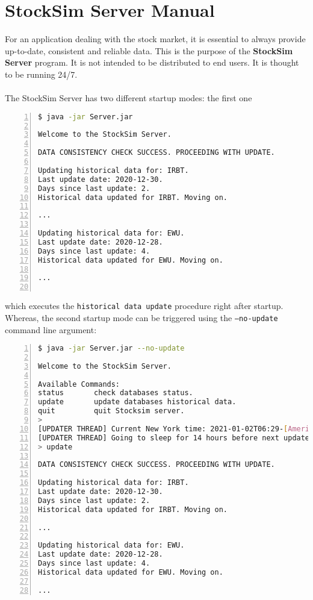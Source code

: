 \chapter{StockSim Server Manual}
For an application dealing with the stock market, it is essential to 
always provide up-to-date, consistent and reliable data. This is the purpose of 
the \textbf{StockSim Server} program. It is not intended to be distributed to 
end users. It is thought to be running 24/7.\\
\\
The StockSim Server has two different startup modes: the first one
\begin{lstlisting}[basicstyle=\footnotesize,language=bash,numbers=left,
numberstyle=\footnotesize,numbersep=8pt,frame=single]
$ java -jar Server.jar

Welcome to the StockSim Server.

DATA CONSISTENCY CHECK SUCCESS. PROCEEDING WITH UPDATE.

Updating historical data for: IRBT.
Last update date: 2020-12-30.
Days since last update: 2.
Historical data updated for IRBT. Moving on.

...

Updating historical data for: EWU.
Last update date: 2020-12-28.
Days since last update: 4.
Historical data updated for EWU. Moving on.

...


\end{lstlisting}
which executes the \texttt{historical data update} procedure right after
startup. Whereas, the second startup mode can be triggered using the
\texttt{--no-update} command line argument:
\begin{lstlisting}[basicstyle=\footnotesize,language=bash,numbers=left,
numberstyle=\footnotesize,numbersep=8pt,frame=single]
$ java -jar Server.jar --no-update

Welcome to the StockSim Server.

Available Commands:
status       check databases status.                 
update       update databases historical data.       
quit         quit Stocksim server.                   
> 
[UPDATER THREAD] Current New York time: 2021-01-02T06:29-[America/New_York]
[UPDATER THREAD] Going to sleep for 14 hours before next update.
> update

DATA CONSISTENCY CHECK SUCCESS. PROCEEDING WITH UPDATE.

Updating historical data for: IRBT.
Last update date: 2020-12-30.
Days since last update: 2.
Historical data updated for IRBT. Moving on.

...

Updating historical data for: EWU.
Last update date: 2020-12-28.
Days since last update: 4.
Historical data updated for EWU. Moving on.

...

\end{lstlisting}
